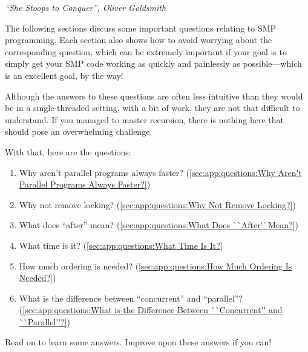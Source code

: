 
%
	 {\emph{``She Stoops to Conquer'', Oliver Goldsmith}}

The following sections discuss some important questions relating to
SMP programming.
Each section also shows how to avoid worrying about
the corresponding question, which can be extremely important if
your goal is to simply get your SMP code working as quickly and
painlessly as possible---which is an excellent goal, by the way!

Although the answers to these questions are often less
intuitive than they would be in a single-threaded setting,
with a bit of work, they are not that difficult to understand.
If you managed to master recursion, there is nothing here that should
pose an overwhelming challenge.

With that, here are the questions:

\begin{enumerate}
\item	Why aren't parallel programs always faster?
	(\cref{sec:app:questions:Why Aren't Parallel Programs Always Faster?})
\item	Why not remove locking?
	(\cref{sec:app:questions:Why Not Remove Locking?})
\item	What does ``after'' mean?
	(\cref{sec:app:questions:What Does ``After'' Mean?})
\item	What time is it?
	(\cref{sec:app:questions:What Time Is It?}
\item	How much ordering is needed?
	(\cref{sec:app:questions:How Much Ordering Is Needed?})
\item	What is the difference between ``concurrent'' and ``parallel''?
	(\cref{sec:app:questions:What is the Difference Between ``Concurrent'' and ``Parallel''?})
\end{enumerate}

Read on to learn some answers.
Improve upon these answers if you can!










